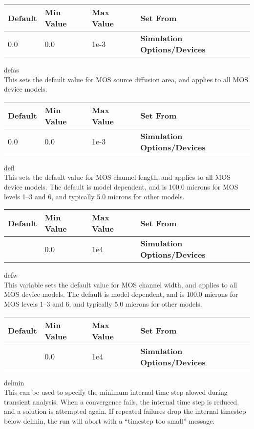 \begin{description}
\begin{tabular}{|l|l|l|l|}\hline
\bf Default & \bf Min Value & \bf Max Value & \bf Set From\\ \hline
0.0 & 0.0 & 1e-3 & \bf Simulation Options/Devices\\ \hline
\end{tabular}
 
\item{\et defas}\\
This sets the default value for MOS source diffusion area, and applies
to all MOS device models.

\begin{tabular}{|l|l|l|l|}\hline
\bf Default & \bf Min Value & \bf Max Value & \bf Set From\\ \hline
0.0 & 0.0 & 1e-3 & \bf Simulation Options/Devices\\ \hline
\end{tabular}
 
\item{\et defl}\\
This sets the default value for MOS channel length, and applies to all
MOS device models.  The default is model dependent, and is 100.0
microns for MOS levels 1--3 and 6, and typically 5.0 microns for other
models.

\begin{tabular}{|l|l|l|l|}\hline
\bf Default & \bf Min Value & \bf Max Value & \bf Set From\\ \hline
 & 0.0 & 1e4 & \bf Simulation Options/Devices\\ \hline
\end{tabular}
 
\item{\et defw}\\
This variable sets the default value for MOS channel width, and
applies to all MOS device models.  The default is model dependent, and
is 100.0 microns for MOS levels 1--3 and 6, and typically 5.0 microns
for other models.

\begin{tabular}{|l|l|l|l|}\hline
\bf Default & \bf Min Value & \bf Max Value & \bf Set From\\ \hline
 & 0.0 & 1e4 & \bf Simulation Options/Devices\\ \hline
\end{tabular}
 
\item{\et delmin}\\
This can be used to specify the minimum internal time step alowed
during transient analysis.  When a convergence fails, the internal
time step is reduced, and a solution is attempted again.  If repeated
failures drop the internal timestep below {\vt delmin}, the run will
abort with a ``timestep too small'' message.


\end{description}
